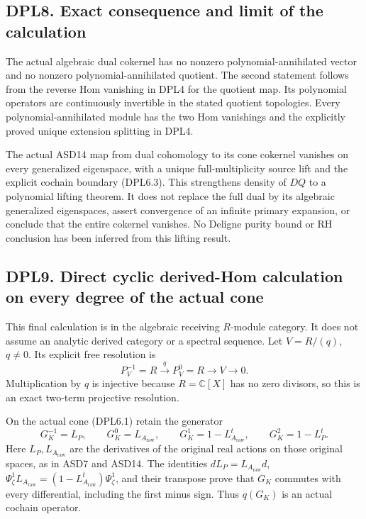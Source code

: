 \subsection{DPL8. Exact consequence and limit of the
calculation}\label{dpl8.-exact-consequence-and-limit-of-the-calculation}

The actual algebraic dual cokernel has no nonzero polynomial-annihilated
vector and no nonzero polynomial-annihilated quotient. The second
statement follows from the reverse Hom vanishing in DPL4 for the
quotient map. Its polynomial operators are continuously invertible in
the stated quotient topologies. Every polynomial-annihilated module has
the two Hom vanishings and the explicitly proved unique extension
splitting in DPL4.

The actual ASD14 map from dual cohomology to its cone cokernel vanishes
on every generalized eigenspace, with a unique full-multiplicity source
lift and the explicit cochain boundary (DPL6.3). This strengthens
density of \(DQ\) to a polynomial lifting theorem. It does not replace
the full dual by its algebraic generalized eigenspaces, assert
convergence of an infinite primary expansion, or conclude that the
entire cokernel vanishes. No Deligne purity bound or RH conclusion has
been inferred from this lifting result.

\subsection{DPL9. Direct cyclic derived-Hom calculation on every degree
of the actual
cone}\label{dpl9.-direct-cyclic-derived-hom-calculation-on-every-degree-of-the-actual-cone}

This final calculation is in the algebraic receiving \(R\)-module
category. It does not assume an analytic derived category or a spectral
sequence. Let \(V=R/(q)\), \(q\ne0\). Its explicit free resolution is \[
P_V^{-1}=R\xrightarrow{\,q\,}P_V^0=R
\longrightarrow V\longrightarrow0.
\tag{DPL9.1}
\] Multiplication by \(q\) is injective because \(R=\mathbb C[X]\) has
no zero divisors, so this is an exact two-term projective resolution.

On the actual cone (DPL6.1) retain the generator \[
G_K^{-1}=L_P,\qquad G_K^0=L_{A_{\mathrm{raw}}},
\qquad G_K^1=1-L_{A_{\mathrm{raw}}}^t,\qquad
G_K^2=1-L_P^t.
\tag{DPL9.2}
\] Here \(L_P,L_{A_{\mathrm{raw}}}\) are the derivatives of the original
real actions on those original spaces, as in ASD7 and ASD14. The
identities \(dL_P=L_{A_{\mathrm{raw}}}d\),
\(\Psi_\zeta^1L_{A_{\mathrm{raw}}}=(1-L_{A_{\mathrm{raw}}}^t)\Psi_\zeta^1\),
and their transpose prove that \(G_K\) commutes with every differential,
including the first minus sign. Thus \(q(G_K)\) is an actual cochain
operator.

